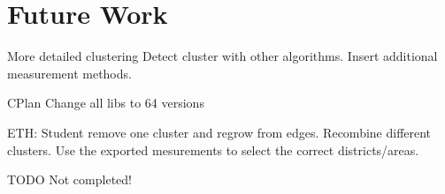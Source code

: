 \chapter{Future Work}
\label{sec:future_work}
More detailed clustering
Detect cluster with other algorithms.
Insert additional measurement methods.

CPlan
Change all libs to 64 versions

ETH: 
Student remove one cluster and regrow from edges.
Recombine different clusters.
Use the exported mesurements to select the correct districts/areas.

TODO Not completed!